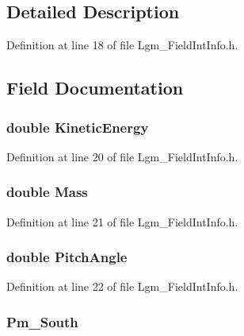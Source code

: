 \subsection{Detailed Description}


Definition at line 18 of file Lgm\_\-FieldIntInfo.h.

\subsection{Field Documentation}
\hypertarget{struct_lgm___field_int_info_869c8a1c2af0f48c6e871b08c13d2852}{
\subsubsection[{KineticEnergy}]{\setlength{\rightskip}{0pt plus 5cm}double {\bf KineticEnergy}}}
\label{struct_lgm___field_int_info_869c8a1c2af0f48c6e871b08c13d2852}




Definition at line 20 of file Lgm\_\-FieldIntInfo.h.\hypertarget{struct_lgm___field_int_info_c33418187547ea28dda7063924f34df6}{
\subsubsection[{Mass}]{\setlength{\rightskip}{0pt plus 5cm}double {\bf Mass}}}
\label{struct_lgm___field_int_info_c33418187547ea28dda7063924f34df6}




Definition at line 21 of file Lgm\_\-FieldIntInfo.h.\hypertarget{struct_lgm___field_int_info_86da8321817d74036d3ff23e8643dc68}{
\subsubsection[{PitchAngle}]{\setlength{\rightskip}{0pt plus 5cm}double {\bf PitchAngle}}}
\label{struct_lgm___field_int_info_86da8321817d74036d3ff23e8643dc68}




Definition at line 22 of file Lgm\_\-FieldIntInfo.h.\hypertarget{struct_lgm___field_int_info_a6b4371f4272ea673b10df3806973a78}{
\subsubsection[{Pm\_\-South}]{ {\bf Pm\_\-South}}}
\label{struct_lgm___field_int_info_a6b4371f4272ea673b10df3806973a78}




